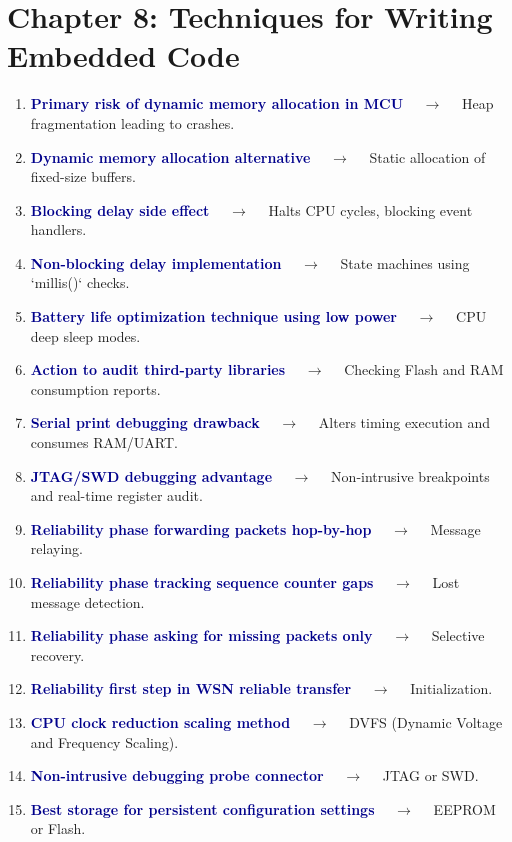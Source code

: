 \documentclass[11pt,a4paper]{article}
\begin{document}
\section*{Chapter 8: Techniques for Writing Embedded Code}

\begin{enumerate}[label=\arabic*., leftmargin=*, labelsep=0.8em, itemsep=0.35em, parsep=0.1em, topsep=0.2em]
  \item \textcolor{darkblue}{\textbf{Primary risk of dynamic memory allocation in MCU}} $\quad\to\quad$ Heap fragmentation leading to crashes.
  \item \textcolor{darkblue}{\textbf{Dynamic memory allocation alternative}} $\quad\to\quad$ Static allocation of fixed-size buffers.
  \item \textcolor{darkblue}{\textbf{Blocking delay side effect}} $\quad\to\quad$ Halts CPU cycles, blocking event handlers.
  \item \textcolor{darkblue}{\textbf{Non-blocking delay implementation}} $\quad\to\quad$ State machines using `millis()` checks.
  \item \textcolor{darkblue}{\textbf{Battery life optimization technique using low power}} $\quad\to\quad$ CPU deep sleep modes.
  \item \textcolor{darkblue}{\textbf{Action to audit third-party libraries}} $\quad\to\quad$ Checking Flash and RAM consumption reports.
  \item \textcolor{darkblue}{\textbf{Serial print debugging drawback}} $\quad\to\quad$ Alters timing execution and consumes RAM/UART.
  \item \textcolor{darkblue}{\textbf{JTAG/SWD debugging advantage}} $\quad\to\quad$ Non-intrusive breakpoints and real-time register audit.
  \item \textcolor{darkblue}{\textbf{Reliability phase forwarding packets hop-by-hop}} $\quad\to\quad$ Message relaying.
  \item \textcolor{darkblue}{\textbf{Reliability phase tracking sequence counter gaps}} $\quad\to\quad$ Lost message detection.
  \item \textcolor{darkblue}{\textbf{Reliability phase asking for missing packets only}} $\quad\to\quad$ Selective recovery.
  \item \textcolor{darkblue}{\textbf{Reliability first step in WSN reliable transfer}} $\quad\to\quad$ Initialization.
  \item \textcolor{darkblue}{\textbf{CPU clock reduction scaling method}} $\quad\to\quad$ DVFS (Dynamic Voltage and Frequency Scaling).
  \item \textcolor{darkblue}{\textbf{Non-intrusive debugging probe connector}} $\quad\to\quad$ JTAG or SWD.
  \item \textcolor{darkblue}{\textbf{Best storage for persistent configuration settings}} $\quad\to\quad$ EEPROM or Flash.
\end{enumerate}
\end{document}
